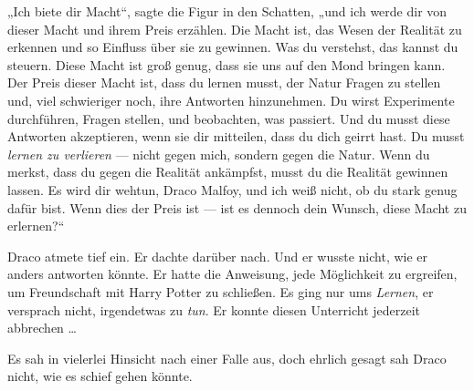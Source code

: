 „Ich biete dir Macht“, sagte die Figur in den Schatten, „und ich werde dir von dieser Macht und ihrem Preis erzählen. Die Macht ist, das Wesen der Realität zu erkennen und so Einfluss über sie zu gewinnen. Was du verstehst, das kannst du steuern. Diese Macht ist groß genug, dass sie uns auf den Mond bringen kann. Der Preis dieser Macht ist, dass du lernen musst, der Natur Fragen zu stellen und, viel schwieriger noch, ihre Antworten hinzunehmen. Du wirst Experimente durchführen, Fragen stellen, und beobachten, was passiert. Und du musst diese Antworten akzeptieren, wenn sie dir mitteilen, dass du dich geirrt hast. Du musst \emph{lernen zu verlieren} — nicht gegen mich, sondern gegen die Natur. Wenn du merkst, dass du gegen die Realität ankämpfst, musst du die Realität gewinnen lassen. Es wird dir wehtun, Draco Malfoy, und ich weiß nicht, ob du stark genug dafür bist. Wenn dies der Preis ist — ist es dennoch dein Wunsch, diese Macht zu erlernen?“

Draco atmete tief ein. Er dachte darüber nach. Und er wusste nicht, wie er anders antworten könnte. Er hatte die Anweisung, jede Möglichkeit zu ergreifen, um Freundschaft mit Harry Potter zu schließen. Es ging nur ums \emph{Lernen}, er versprach nicht, irgendetwas zu \emph{tun}. Er konnte diesen Unterricht jederzeit abbrechen …

Es sah in vielerlei Hinsicht nach einer Falle aus, doch ehrlich gesagt sah Draco nicht, wie es schief gehen könnte.

